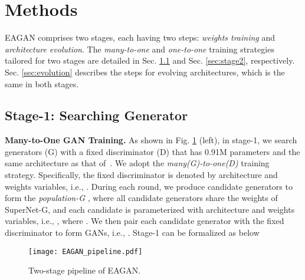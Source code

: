 \documentclass[runningheads]{llncs}
\begin{document}
\section{Methods}












EAGAN comprises two stages, each having two steps: \textit{weights training} and \textit{architecture evolution}. The \textit{many-to-one} and \textit{one-to-one} training strategies tailored for two stages are detailed in Sec. \ref{sec:stage1} and Sec. \ref{sec:stage2}, respectively. Sec. \ref{sec:evolution} describes the steps for evolving architectures, which is the same in both stages.






\subsection{Stage-1: Searching Generator}\label{sec:stage1}




\textbf{Many-to-One GAN Training.} As shown in Fig. \ref{fig:EAGAN} (left), in stage-1, we search generators (G) with a fixed discriminator (D) that has 0.91M parameters and the same architecture as that of~\cite{Adversarialnas}. We adopt the \textit{many(G)-to-one(D)} training strategy. Specifically, the fixed discriminator  is denoted by architecture and weights variables, i.e., . During each round, we produce  candidate generators to form the \textit{population-G} , where all candidate generators share the weights  of SuperNet-G, and each candidate  is parameterized with architecture and weights variables, i.e., , where . We then pair each candidate generator with the fixed discriminator  to form  GANs, i.e., . Stage-1 can be formalized as below













\begin{figure}
    \centering
    \texttt{[image: EAGAN\_pipeline.pdf]}
    \caption{Two-stage pipeline of EAGAN. 
}
    \label{fig:EAGAN}
\end{figure}
\end{document}
